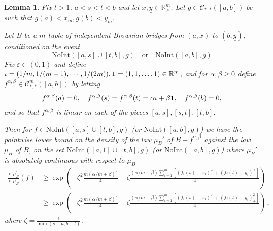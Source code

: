 \documentclass[11pt, reqno]{amsart}
\numberwithin{equation}{section}
\newcounter{dummy} \numberwithin{dummy}{section}
\newtheorem{lemma}[dummy]{Lemma}
\newcommand{\R}{\ensuremath{\mathbb{R}}}
\newcommand{\diff}{\ensuremath{\operatorname{d}\!}}
\begin{document}
\begin{lemma}{\cite[Lemma 3.3]{dauvergne2024wienerdensitiesairyline}}
	\label{lemma: bridge-shift-calc}
	Fix $t>1$, $a<s<t<b$ and let $\underline{x}, \underline{y} \in \R^m_>$. Let $g \in \mathscr{C}_{*,*}([a, b])$ be such that $g(a) < x_m, g(b) < y_m$.
	
	Let $B$ be a $m$-tuple of independent Brownian bridges from $(a, \underline{x})$ to $(b, \underline{y})$, conditioned on the event
	$$
	\mathrm{NoInt}([a, s] \cup [t, b], g) \quad \mathrm{ or }\quad \mathrm{NoInt}([a, b], g) 
	$$ 
	Fix $\varepsilon \in (0,1)$ and define $\iota = (1/m, 1/(m+1), \cdots, 1/(2m)) ,  {\bf 1} = (1, 1, \dots, 1) \in \R^m$, and for $\alpha, \beta \ge 0$ define $f^{\alpha, \beta} \in \mathscr{C}^m_{*, *}([a, b])$ by letting 
	$$
	f^{\alpha, \beta}(a) = 0, \quad f^{\alpha, \beta}(s) = f^{\alpha, \beta}(t) = \alpha \iota + \beta {\bf 1}, \quad f^{\alpha, \beta}(b) = 0,
	$$
	and so that $f^{\alpha, \beta}$ is linear on each of the pieces $[a, s], [s, t], [t, b]$.
	
	Then for $f \in \mathrm{NoInt}([a, s] \cup [t, b], g)$ (or $\mathrm{NoInt}([a, b], g) $)  we have the pointwise lower bound on the density of the law $\mu_B'$ of $B - f^{\alpha, \beta}$ against the law $\mu_B$ of $B$, on the set $\mathrm{NoInt}([a, 1] \cup [t, b], g)$ (or $\mathrm{NoInt}([a, b], g) $) where $\mu_B'$ is absolutely continuous with respect to $\mu_B$
	\begin{align}
	\label{eq: Radon-Nikodym -B-bd}
	\frac{\diff \mu^\prime_B}{\diff \mu_B}(f) &\ge \exp \left(-\zeta^2\frac{m(\alpha/m + \beta)^2}{4} - \zeta\frac{(\alpha/m + \beta)\sum_{i=1}^m [(f_i(s) - x_i)^+ + (f_i(t) - y_i)^+]}{4} \right)\\
	   &\ge \exp \left(-\zeta^2\frac{m(\alpha/m + \beta)^2}{4} - \zeta\frac{(\alpha/m + \beta)\sum_{i=1}^m [(f_i(s) - x_i)^2_+ + (f_i(t) - y_i)^2_+]}{4} \right)\,,
	\end{align} 
    where $\zeta = \frac{1}{\min(s-a, b-t)}$.
\end{lemma}
\end{document}
